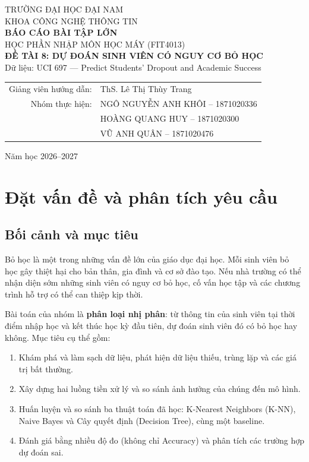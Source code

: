 \documentclass[12pt,a4paper]{article}
\begin{document}
\begin{titlepage}
\centering
{\large TRƯỜNG ĐẠI HỌC ĐẠI NAM}\\[0.3cm]
{\large KHOA CÔNG NGHỆ THÔNG TIN}\\[2cm]
{\Large\bfseries BÁO CÁO BÀI TẬP LỚN}\\[0.3cm]
{\large HỌC PHẦN NHẬP MÔN HỌC MÁY (FIT4013)}\\[1.5cm]
{\Large\bfseries ĐỀ TÀI 8: DỰ ĐOÁN SINH VIÊN CÓ NGUY CƠ BỎ HỌC}\\[0.5cm]
{\large Dữ liệu: UCI 697 — Predict Students' Dropout and Academic Success}\\[2.5cm]
\begin{tabular}{rl}
Giảng viên hướng dẫn: & ThS. Lê Thị Thùy Trang\\
Nhóm thực hiện: & NGÔ NGUYỄN ANH KHÔI -- 1871020336\\
 & HOÀNG QUANG HUY -- 1871020300\\
 & VŨ ANH QUÂN -- 1871020476\\
\end{tabular}
\vfill
{\large Năm học 2026--2027}
\end{titlepage}

\tableofcontents
\newpage
\listoftables
\listoffigures
\newpage

\section{Đặt vấn đề và phân tích yêu cầu}

\subsection{Bối cảnh và mục tiêu}
Bỏ học là một trong những vấn đề lớn của giáo dục đại học. Mỗi sinh viên bỏ học gây thiệt hại cho bản thân, gia đình và cơ sở đào tạo. Nếu nhà trường có thể nhận diện sớm những sinh viên có nguy cơ bỏ học, cố vấn học tập và các chương trình hỗ trợ có thể can thiệp kịp thời.

Bài toán của nhóm là \textbf{phân loại nhị phân}: từ thông tin của sinh viên tại thời điểm nhập học và kết thúc học kỳ đầu tiên, dự đoán sinh viên đó có bỏ học hay không. Mục tiêu cụ thể gồm:
\begin{enumerate}[label=(\alph*)]
  \item Khám phá và làm sạch dữ liệu, phát hiện dữ liệu thiếu, trùng lặp và các giá trị bất thường.
  \item Xây dựng hai luồng tiền xử lý và so sánh ảnh hưởng của chúng đến mô hình.
  \item Huấn luyện và so sánh ba thuật toán đã học: K-Nearest Neighbors (K-NN), Naive Bayes và Cây quyết định (Decision Tree), cùng một baseline.
  \item Đánh giá bằng nhiều độ đo (không chỉ Accuracy) và phân tích các trường hợp dự đoán sai.
\end{enumerate}
\end{document}
